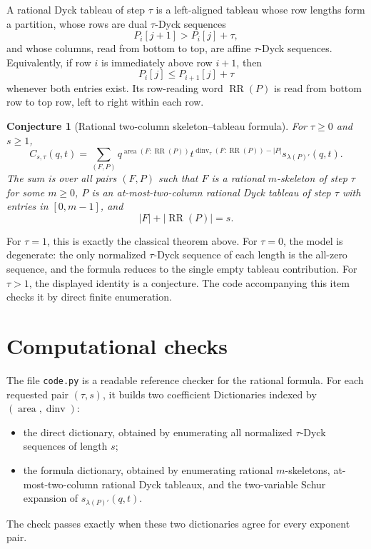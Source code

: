 \documentclass{article}
\DeclareMathOperator{\area}{area}
\DeclareMathOperator{\dinv}{dinv}
\DeclareMathOperator{\RR}{RR}
\newtheorem{conjecture}{Conjecture}
\begin{document}
A rational Dyck tableau of step \(\tau\) is a left-aligned tableau whose row
lengths form a partition, whose rows are dual \(\tau\)-Dyck sequences
\[
  P_i[j+1]>P_i[j]+\tau,
\]
and whose columns, read from bottom to top, are affine \(\tau\)-Dyck
sequences.  Equivalently, if row \(i\) is immediately above row \(i+1\), then
\[
  P_i[j]\le P_{i+1}[j]+\tau
\]
whenever both entries exist.  Its row-reading word \(\RR(P)\) is read from
bottom row to top row, left to right within each row.

\begin{conjecture}[Rational two-column skeleton--tableau formula]
For \(\tau\ge0\) and \(s\ge1\),
\[
  C_{s,\tau}(q,t)
  =
  \sum_{(F,P)}
  q^{\area(F:\RR(P))}
  t^{\dinv_\tau(F:\RR(P))-|P|}
  s_{\lambda(P)'}(q,t).
\]
The sum is over all pairs \((F,P)\) such that \(F\) is a rational
\(m\)-skeleton of step \(\tau\) for some \(m\ge0\), \(P\) is an
at-most-two-column rational Dyck tableau of step \(\tau\) with entries in
\([0,m-1]\), and
\[
  |F|+|\RR(P)|=s.
\]
\end{conjecture}

For \(\tau=1\), this is exactly the classical theorem above.  For \(\tau=0\),
the model is degenerate: the only normalized \(\tau\)-Dyck sequence of each
length is the all-zero sequence, and the formula reduces to the single empty
tableau contribution.  For \(\tau>1\), the displayed identity is a conjecture.
The code accompanying this item checks it by direct finite enumeration.

\section{Computational checks}

The file \texttt{code.py} is a readable reference checker for the rational
formula.  For each requested pair \((\tau,s)\), it builds two coefficient
Dictionaries indexed by \((\area,\dinv)\):
\begin{itemize}
  \item the direct dictionary, obtained by enumerating all normalized
        \(\tau\)-Dyck sequences of length \(s\);
  \item the formula dictionary, obtained by enumerating rational
        \(m\)-skeletons, at-most-two-column rational Dyck tableaux, and the
        two-variable Schur expansion of \(s_{\lambda(P)'}(q,t)\).
\end{itemize}
The check passes exactly when these two dictionaries agree for every exponent
pair.
\end{document}
